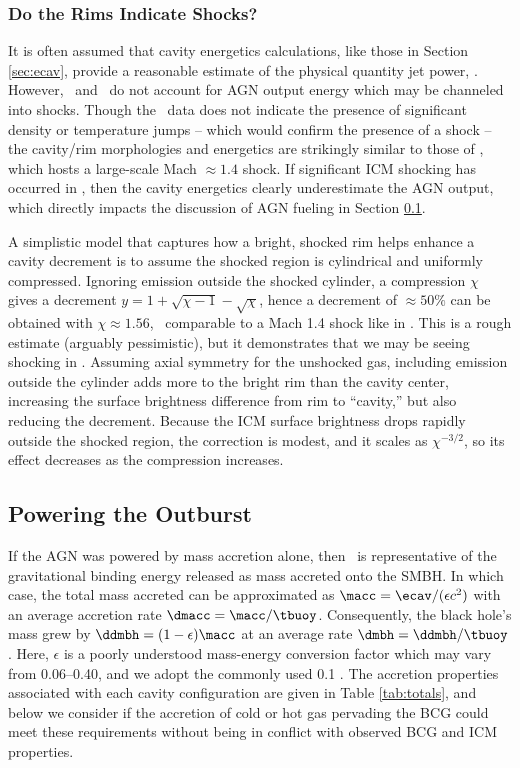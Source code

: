 \documentclass[iop]{emulateapj-rtx4}
\begin{document}
\subsubsection{Do the Rims Indicate Shocks?}
\label{sec:shocks}

It is often assumed that cavity energetics calculations, like those in
Section \ref{sec:ecav}, provide a reasonable estimate of the physical
quantity jet power, \pjet. However, \pcav\ and \pjet\ do not account
for AGN output energy which may be channeled into shocks. Though the
\cxo\ data does not indicate the presence of significant density or
temperature jumps -- which would confirm the presence of a shock --
the cavity/rim morphologies and energetics are strikingly similar to
those of \ms, which hosts a large-scale Mach $\approx 1.4$ shock. If
significant ICM shocking has occurred in \rbs, then the cavity
energetics clearly underestimate the AGN output, which directly
impacts the discussion of AGN fueling in Section \ref{sec:accretion}.

A simplistic model that captures how a bright, shocked rim helps
enhance a cavity decrement is to assume the shocked region is
cylindrical and uniformly compressed. Ignoring emission outside the
shocked cylinder, a compression $\chi$ gives a decrement $y = 1 +
\sqrt{\chi - 1} - \sqrt{\chi}$, hence a decrement of $\approx 50\%$
can be obtained with $\chi \approx 1.56$, \ie\ comparable to a Mach
1.4 shock like in \ms. This is a rough estimate (arguably
pessimistic), but it demonstrates that we may be seeing shocking in
\rbs. Assuming axial symmetry for the unshocked gas, including
emission outside the cylinder adds more to the bright rim than the
cavity center, increasing the surface brightness difference from rim
to ``cavity,'' but also reducing the decrement. Because the ICM
surface brightness drops rapidly outside the shocked region, the
correction is modest, and it scales as $\chi^{-3/2}$, so its effect
decreases as the compression increases.

\subsection{Powering the Outburst}
\label{sec:accretion}

If the AGN was powered by mass accretion alone, then \ecav\ is
representative of the gravitational binding energy released as mass
accreted onto the SMBH. In which case, the total mass accreted can be
approximated as $\macc = \ecav/(\epsilon c^2)$ with an average
accretion rate $\dmacc = \macc/\tbuoy$. Consequently, the black hole's
mass grew by $\ddmbh = (1-\epsilon)\macc$ at an average rate $\dmbh =
\ddmbh/\tbuoy$. Here, $\epsilon$ is a poorly understood mass-energy
conversion factor which may vary from 0.06--0.40, and we adopt the
commonly used 0.1 \citep{2002apa..book.....F}. The accretion
properties associated with each cavity configuration are given in
Table \ref{tab:totals}, and below we consider if the accretion of cold
or hot gas pervading the BCG could meet these requirements without
being in conflict with observed BCG and ICM properties.
\end{document}
